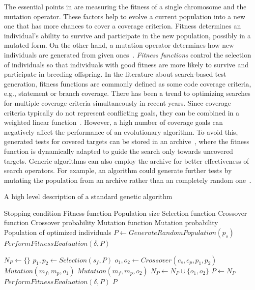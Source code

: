 \documentclass[paper=a4,%
  twoside,%
  BCOR4mm,%
  abstract=true,%
  toc=bibliography,%
  chapterprefix=true,%
  toc=bibliographynumbered,%
  open=right,%
  english,%
  pagesize=pdftex]{scrreprt}
\newcommand{\Desc}[2]{\State \makebox[2em][l]{#1}#2}
\begin{document}
The essential points in  are measuring the fitness of a single chromosome and the mutation operator. These factors help to evolve a current population into a new one that has more chances to cover a coverage criterion. Fitness determines an individual's ability to survive and participate in the new population, possibly in a mutated form. On the other hand, a mutation operator determines how new individuals are generated from given ones~\cite{Tonella2004}. \emph{Fitness functions} control the selection of individuals so that individuals with good fitness are more likely to survive and participate in breeding offspring. In the literature about search-based test generation, fitness functions are commonly defined as some code coverage criteria, e.g., statement or branch coverage. There has been a trend to optimizing searches for multiple coverage criteria simultaneously in recent years. Since coverage criteria typically do not represent conflicting goals, they can be combined in a weighted linear function~\cite{Rojas2015}. However, a high number of coverage goals can negatively affect the performance of an evolutionary algorithm. To avoid this, generated tests for covered targets can be stored in an archive~\cite{Rojas2017}, where the fitness function is dynamically adapted to guide the search only towards uncovered targets. Generic algorithms can also employ the archive for better effectiveness of search operators. For example, an algorithm could generate further tests by mutating the population from an archive rather than an completely random one~\cite{Campos2017}.

\begin{algorithm}
\caption{A high level description of a standard genetic algorithm~\cite{Campos2017}}\label{alg:genetic-algorithm}
\begin{algorithmic}
\Input
  \Desc{$C$}{Stopping condition}
  \Desc{$\delta$}{Fitness function}
  \Desc{$p_s$}{Population size}
  \Desc{$s_f$}{Selection function}
  \Desc{$c_f$}{Crossover function}
  \Desc{$c_p$}{Crossover probability}
  \Desc{$m_f$}{Mutation function}
  \Desc{$m_p$}{Mutation probability}
  \EndInput
  \Output
  \Desc{$P$}{Population of optimized individuals}
  \EndOutput
\State $P \gets GenerateRandomPopulation(p_s)$
\State $PerformFitnessEvaluation(\delta, P)$

    \State $N_P \gets \{\}$
        \State $p_1, p_2 \gets Selection(s_f, P)$
        \State $o_1, o_2 \gets Crossover(c_s, c_p, p_1, p_2)$
        \State $Mutation(m_f, m_p, o_1)$
        \State $Mutation(m_f, m_p, o_2)$
        \State $N_P \gets N_P \cup \{o_1, o_2\}$
    \EndWhile
    \State $P \gets N_P$
    \State $PerformFitnessEvaluation(\delta, P)$
\EndWhile
\State \Return $P$
\end{algorithmic}
\end{algorithm}
\end{document}
